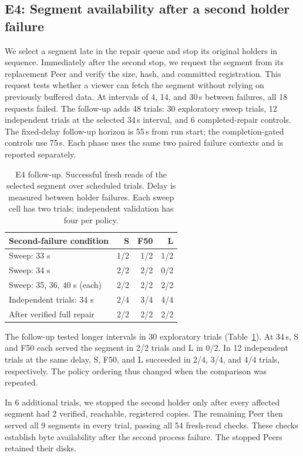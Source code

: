 \subsection{E4: Segment availability after a second holder failure}
We select a segment late in the repair queue and stop its original
holders in sequence. Immediately after the second stop, we request the
segment from its replacement Peer and verify the size, hash, and committed
registration. This request tests whether a viewer can fetch the segment
without relying on previously buffered data. At intervals of 4, 14,
and 30\,s between failures, all 18 requests failed.
The follow-up adds 48 trials: 30 exploratory sweep trials, 12 independent
trials at the selected 34\,s interval, and 6 completed-repair controls.
The fixed-delay follow-up horizon is 55\,s from run start; the
completion-gated controls use 75\,s. Each phase uses the same two paired
failure contexts and is reported separately.

\begin{table}[ht]
\centering\small
\caption{E4 follow-up. Successful fresh reads of the selected segment
over scheduled trials. Delay is measured between holder failures.
Each sweep cell has two trials; independent validation has four per policy.}
\label{tab:e4}
\begin{tabular}{@{}lrrr@{}}
\toprule
Second-failure condition & S & F50 & L \\
\midrule
Sweep: 33 s & 1/2 & 1/2 & 1/2 \\
Sweep: 34 s & 2/2 & 2/2 & 0/2 \\
Sweep: 35, 36, 40 s (each) & 2/2 & 2/2 & 2/2 \\
Independent trials: 34 s & 2/4 & 3/4 & 4/4 \\
After verified full repair & 2/2 & 2/2 & 2/2 \\
\bottomrule
\end{tabular}
\end{table}

The follow-up tested longer intervals in 30 exploratory trials
(Table~\ref{tab:e4}). At 34\,s, S and F50 each served the segment in
2/2 trials and L in 0/2. In 12 independent trials at the same delay,
S, F50, and L succeeded in 2/4, 3/4, and 4/4 trials, respectively.
The policy ordering thus changed when the comparison was repeated.

In 6 additional trials, we stopped the second holder only after every
affected segment had 2 verified, reachable, registered copies.
The remaining Peer then served all 9 segments in every trial,
passing all 54 fresh-read checks. These checks establish byte
availability after the second process failure. The stopped Peers
retained their disks.

